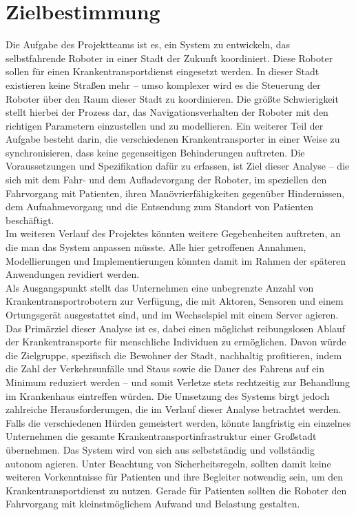 
\section{Zielbestimmung}
Die Aufgabe des Projektteams ist es, ein System zu entwickeln, das selbstfahrende Roboter in einer Stadt der Zukunft koordiniert. 
Diese Roboter sollen für einen Krankentransportdienst eingesetzt werden. 
In dieser Stadt existieren keine Straßen mehr – umso komplexer wird es die Steuerung der Roboter über den Raum dieser Stadt zu koordinieren. 
Die größte Schwierigkeit stellt hierbei der Prozess dar, das Navigationsverhalten der Roboter mit den richtigen Parametern einzustellen und zu modellieren. 
Ein weiterer Teil der Aufgabe besteht darin, die verschiedenen Krankentransporter in einer Weise zu synchronisieren, dass keine gegenseitigen Behinderungen auftreten. 
Die Voraussetzungen und Spezifikation dafür zu erfassen, ist Ziel dieser Analyse – die sich mit dem Fahr- und dem Aufladevorgang der Roboter, im speziellen den Fahrvorgang mit Patienten, ihren Manövrierfähigkeiten gegenüber Hindernissen, dem Aufnahmevorgang und die Entsendung zum Standort von Patienten beschäftigt.\\

Im weiteren Verlauf des Projektes könnten weitere Gegebenheiten auftreten, an die man das System anpassen müsste. 
Alle hier getroffenen Annahmen, Modellierungen und Implementierungen könnten damit im Rahmen der späteren Anwendungen revidiert werden.\\

Als Ausgangspunkt stellt das Unternehmen eine unbegrenzte Anzahl von Krankentransportrobotern zur Verfügung, die mit Aktoren, Sensoren und einem Ortungsgerät ausgestattet sind, und im Wechselspiel mit einem Server agieren.\\

Das Primärziel dieser Analyse ist es, dabei einen möglichst reibungslosen Ablauf der Krankentransporte für menschliche Individuen zu ermöglichen. 
Davon würde die Zielgruppe, spezifisch die Bewohner der Stadt, nachhaltig profitieren, indem die Zahl der Verkehrsunfälle und Staus sowie die Dauer des Fahrens auf ein Minimum reduziert werden – und somit Verletze stets rechtzeitig zur Behandlung im Krankenhaus eintreffen würden. 
Die Umsetzung des Systems birgt jedoch zahlreiche Herausforderungen, die im Verlauf dieser Analyse betrachtet werden. 
Falls die verschiedenen Hürden gemeistert werden, könnte langfristig ein einzelnes Unternehmen die gesamte Krankentransportinfrastruktur einer Großstadt übernehmen. 
Das System wird von sich aus selbstständig und vollständig autonom agieren. Unter Beachtung von Sicherheitsregeln, sollten damit keine weiteren Vorkenntnisse für Patienten und ihre Begleiter notwendig sein, um den Krankentransportdienst zu nutzen. 
Gerade für Patienten sollten die Roboter den Fahrvorgang mit kleinstmöglichem Aufwand und Belastung gestalten.\\

\pagebreak
